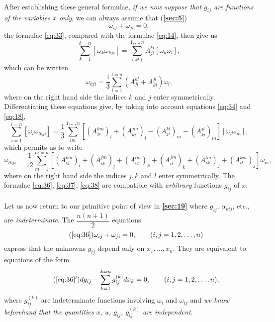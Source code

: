 \documentclass[leqno,12pt]{article}
\theoremstyle{shape1}
\theoremstyle{shape0}
\theoremstyle{shape2}
\theoremstyle{definition}
\begin{document}
\paragraph{}
\label{sec:20}
After establishing these general formulae, \emph{if we now suppose that $g_{ij}$ are functions of the variables $x$ only}, we can always assume that (\textsection\textbf{\ref{sec:5}})
\begin{equation}
  \label{eq:36}
  \omega_{ij}+\omega_{ji}=0,
\end{equation}
the formulae \eqref{eq:33}, compared with the formulae \eqref{eq:14}, then give us
\[
\sum_{k=1}^{k=n}[\omega_{k}\omega_{kji}]=\sum_{(kl)}^{1,\dots, n}A_{ji}^{kl}[\omega_{k}\omega_{l}],
\]
which can be written
\begin{equation}
  \label{eq:37}
  \omega_{kji}=\frac{1}{3}\sum_{l=1}^{l=n}(A^{kl}_{ji}+A^{jl}_{ki})\omega_{l},
\end{equation}
where on the right hand side the indices $k$ and $j$ enter symmetrically. Differentiating these equations give, by taking into account equations \eqref{eq:34} and \eqref{eq:18},
\[
\sum_{i=1}^{i=n}[\omega_{l}\omega_{lkji}]=\frac{1}{3}\sum_{lm}^{1,\dots,n}[(A^{km}_{ji})_{l}+(A^{jm}_{ki})_{l}-(A^{kl}_{ji})_{m}-(A^{jl}_{ki})_{m}][\omega_{l}\omega_{m}],
\]
which permits us to write
\begin{equation}
  \label{eq:38}
  \omega_{lkji}=\frac{1}{12}\sum_{m=1}^{m=n}[(A^{km}_{ij})_{l}+(A^{jm}_{ik})_{l}+(A^{lm}_{ij})_{k}+(A^{jm}_{il})_{k}+(A^{lm}_{ik})_{j}+(A^{km}_{il})_{j}]\omega_{m},
\end{equation}
where on the right hand side the indices $j,k$ and $l$ enter symmetrically. The formulae \eqref{eq:36}, \eqref{eq:37}, \eqref{eq:38} are compatible with \emph{arbitrary} functions $g_{ij}$ of $x$.


\paragraph{}
\label{sec:21}
Let us now return to our primitive point of view in \textsection\textbf{\ref{sec:19}} where $g_{ij}$, $\alpha_{kij}$, etc., are \emph{indeterminate}. The $\dfrac{n(n+1)}{2}$ equations
\begin{equation}
  \label{eq:36a}\tag{\ref{eq:36}}
  \omega_{ij}+\omega_{ji}=0, \qquad(i,j=1,2,\dots,n)
\end{equation}
express that the unknowns $g_{ij}$ depend only on $x_{1},\dots,x_{n}$. They are equivalent to equations of the form
\begin{equation}
  \label{eq:36'}\tag{\ref{eq:36}$'$}
  dg_{ij}-\sum_{k=1}^{k=n}g_{ij}^{(k)}dx_{k}=0,\qquad(i,j=1,2,\dots,n),
\end{equation}
where $g_{ij}^{(k)}$ are indeterminate functions involving $\omega_{i}$ and $\omega_{ij}$ and \emph{we know beforehand that the quantities $x$, $u$, $g_{ij}$, $g_{ij}^{(k)}$ are independent.}
\end{document}
